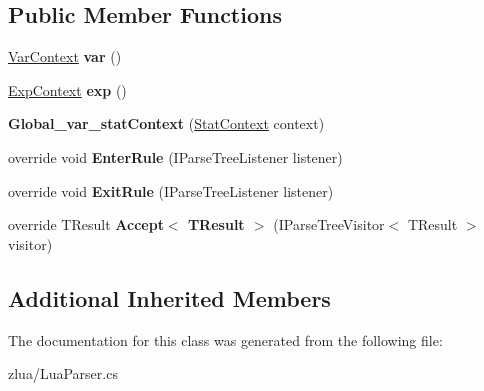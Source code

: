 \subsection*{Public Member Functions}
\begin{DoxyCompactItemize}
\item 
\mbox{\label{classzlua_1_1_lua_parser_1_1_global__var__stat_context_ab3995e184a34af0164126cfd9dc9b930}} 
\mbox{\hyperlink{classzlua_1_1_lua_parser_1_1_var_context}{Var\+Context}} {\bfseries var} ()
\item 
\mbox{\label{classzlua_1_1_lua_parser_1_1_global__var__stat_context_a800e7a2aadee1e1e7193393f3d6603e9}} 
\mbox{\hyperlink{classzlua_1_1_lua_parser_1_1_exp_context}{Exp\+Context}} {\bfseries exp} ()
\item 
\mbox{\label{classzlua_1_1_lua_parser_1_1_global__var__stat_context_a93d4c3b82a8e289402cb758715acbe42}} 
{\bfseries Global\+\_\+var\+\_\+stat\+Context} (\mbox{\hyperlink{classzlua_1_1_lua_parser_1_1_stat_context}{Stat\+Context}} context)
\item 
\mbox{\label{classzlua_1_1_lua_parser_1_1_global__var__stat_context_afd37a410a364103b506ce82b12001cca}} 
override void {\bfseries Enter\+Rule} (I\+Parse\+Tree\+Listener listener)
\item 
\mbox{\label{classzlua_1_1_lua_parser_1_1_global__var__stat_context_a8f03da53bf7a6146ed39747adac9f21b}} 
override void {\bfseries Exit\+Rule} (I\+Parse\+Tree\+Listener listener)
\item 
\mbox{\label{classzlua_1_1_lua_parser_1_1_global__var__stat_context_a55a80470346308b091d2561a9f28756c}} 
override T\+Result {\bfseries Accept$<$ T\+Result $>$} (I\+Parse\+Tree\+Visitor$<$ T\+Result $>$ visitor)
\end{DoxyCompactItemize}
\subsection*{Additional Inherited Members}


The documentation for this class was generated from the following file\+:\begin{DoxyCompactItemize}
\item 
zlua/Lua\+Parser.\+cs\end{DoxyCompactItemize}
